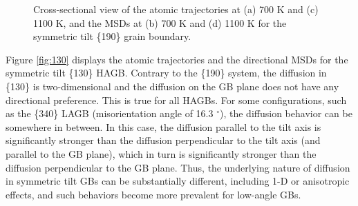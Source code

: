 \documentclass{elsarticle}
\providecommand{\DIFadd}[1]{{\protect\color{blue} \sf #1}} %
\providecommand{\DIFdel}[1]{}
\providecommand{\DIFaddbegin}{} %
\providecommand{\DIFaddend}{} %
\providecommand{\DIFdelbegin}{} %
\providecommand{\DIFdelend}{} %
\providecommand{\DIFaddFL}[1]{\DIFadd{#1}} %
\providecommand{\DIFdelFL}[1]{\DIFdel{#1}} %
\providecommand{\DIFaddbeginFL}{} %
\providecommand{\DIFaddendFL}{} %
\providecommand{\DIFdelbeginFL}{} %
\providecommand{\DIFdelendFL}{} %
\begin{document}
\begin{figure}[!ht]
\begin{subfigure}{0.49\textwidth}
	\end{subfigure}
\caption{\DIFdelbeginFL \DIFdelFL{Atomic trajectory lines in }\DIFdelendFL \DIFaddbeginFL \DIFaddFL{Cross-sectional view of }\DIFaddendFL the \DIFdelbeginFL \DIFdelFL{GB cross sections }\DIFdelendFL \DIFaddbeginFL \DIFaddFL{atomic trajectories }\DIFaddendFL at (a) 700 K and (c) 1100 K, and the \DIFdelbeginFL \DIFdelFL{MSD }\DIFdelendFL \DIFaddbeginFL \DIFaddFL{MSDs }\DIFaddendFL at (b) 700 K and (d) 1100 K for the symmetric tilt \{190\} grain boundary.}
\label{fig:190}
\end{figure}

Figure \ref{fig:130} displays the atomic trajectories and the directional MSDs for the symmetric tilt \{130\} \DIFdelbegin \DIFdel{GB}\DIFdelend \DIFaddbegin \DIFadd{HAGB}\DIFaddend . Contrary to the \{190\} system, the diffusion in \{130\} is two-dimensional \DIFdelbegin \DIFdel{. The }\DIFdelend \DIFaddbegin \DIFadd{and the }\DIFaddend diffusion on the GB plane does not have any directional preference\DIFdelbegin \DIFdel{in this case}\DIFdelend . This is true for \DIFdelbegin \DIFdel{most }\DIFdelend \DIFaddbegin \DIFadd{all }\DIFaddend HAGBs. For some configurations, such as the \{340\} \DIFdelbegin \DIFdel{system }\DIFdelend \DIFaddbegin \DIFadd{LAGB }\DIFaddend (misorientation angle of 16.3\DIFdelbegin \DIFdel{degrees}\DIFdelend \DIFaddbegin \DIFadd{$^{\circ}$}\DIFaddend ), the diffusion behavior can be somewhere in between. In \DIFdelbegin \DIFdel{those cases}\DIFdelend \DIFaddbegin \DIFadd{this case}\DIFaddend , the diffusion parallel to the tilt axis is significantly stronger than the diffusion perpendicular to the tilt axis (and parallel to the GB plane), which in turn is significantly stronger than the diffusion perpendicular to the GB plane. Thus, \DIFdelbegin \DIFdel{while the magnitude of diffusion is only marginally dependent upon the orientation of the GBs, the }\DIFdelend \DIFaddbegin \DIFadd{the }\DIFaddend underlying nature of diffusion \DIFdelbegin \DIFdel{on }\DIFdelend \DIFaddbegin \DIFadd{in }\DIFaddend symmetric tilt GBs can be substantially different, including 1-D or anisotropic effects, and such behaviors become more prevalent for \DIFdelbegin \DIFdel{LAGBs}\DIFdelend \DIFaddbegin \DIFadd{low-angle GBs}\DIFaddend .
\end{document}

